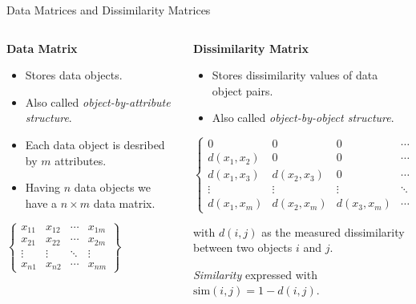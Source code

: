 \begin{frame}{Data Matrices and Dissimilarity Matrices}
  \begin{columns}
    \begin{column}{0.5\textwidth}
      \textbf{Data Matrix}

      \begin{itemize}
      \item Stores data objects.
      \item Also called \textit{object-by-attribute structure}.
      \item Each data object is desribed by $m$ attributes.
      \item Having $n$ data objects we have a $n\times m$ data matrix.
      \end{itemize}
      \vspace*{1em}
      \begin{center}
      {$\begin{Bmatrix}
          x_{11} & x_{12} & \cdots & x_{1m}\\
          x_{21} & x_{22} & \cdots & x_{2m}\\
          \vdots & \vdots & \ddots & \vdots\\
          x_{n1} & x_{n2} & \cdots & x_{nm}
        \end{Bmatrix}$ }
      \end{center}
    \end{column}

    \begin{column}{0.5\textwidth}
      \textbf{Dissimilarity Matrix}

      \begin{itemize}
      \item Stores dissimilarity values of data object pairs.
      \item Also called \textit{object-by-object structure}.
      \end{itemize}
      \begin{center}
        {$\begin{Bmatrix}
          0 & 0 & 0 & \cdots & 0\\
          d(x_{1},x_{2}) & 0 & 0 & \cdots & 0\\
          d(x_{1},x_{3}) & d(x_{2},x_{3}) & 0 & \cdots & 0\\
          \vdots & \vdots & \vdots &\ddots & \vdots\\
          d(x_{1},x_{m}) & d(x_{2},x_{m}) & d(x_{3},x_{m}) & \cdots & 0
        \end{Bmatrix}$}
    \end{center}
    with $d(i, j)$ as the measured dissimilarity between two objects $i$ and $j$.

    \textit{Similarity} expressed with $\text{sim}(i,j) = 1 - d(i, j)$.
    \end{column}
  \end{columns}
\end{frame}

